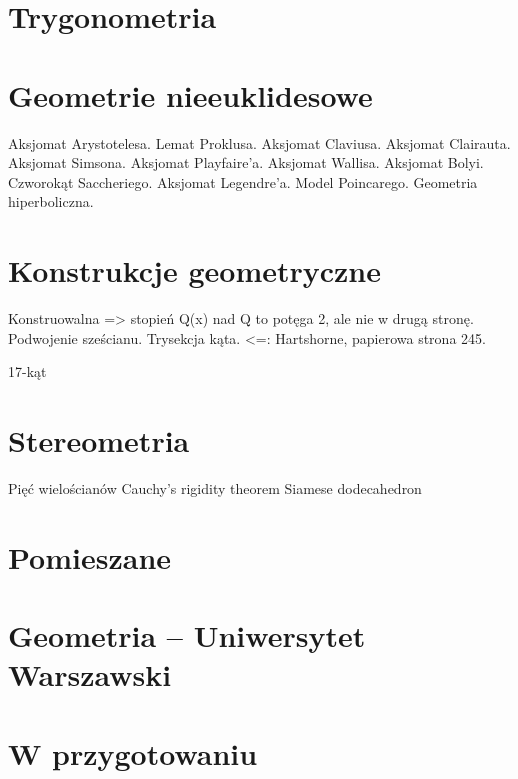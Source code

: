 \documentclass{greaseproof}
\begin{document}
\section{Trygonometria}


\section{Geometrie nieeuklidesowe}
Aksjomat Arystotelesa.
Lemat Proklusa.
Aksjomat Claviusa.
Aksjomat Clairauta.
Aksjomat Simsona.
Aksjomat Playfaire'a.
Aksjomat Wallisa.
Aksjomat Bolyi.
Czworokąt Saccheriego.
Aksjomat Legendre'a.
Model Poincarego.
Geometria hiperboliczna.

\section{Konstrukcje geometryczne}
Konstruowalna => stopień Q(x) nad Q to potęga 2, ale nie w drugą stronę.
Podwojenie sześcianu.
Trysekcja kąta.
<=: Hartshorne, papierowa strona 245.

17-kąt

\section{Stereometria}
Pięć wielościanów
Cauchy's rigidity theorem %
Siamese dodecahedron

\section{Pomieszane}









\section{Geometria -- Uniwersytet Warszawski}






\section{W przygotowaniu}

\end{document}
